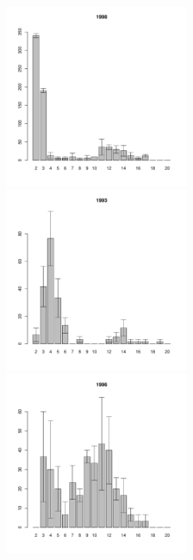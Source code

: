 \begin{figure}[hp]
\begin{minipage}[b]{.3\linewidth}
	\begin{center}
\includegraphics[width=60mm]{../White_Sea/Estuatiy_Luvenga/sizestr2_1998_.pdf}
	\end{center}
	\end{minipage}
	\begin{minipage}[b]{.3\linewidth}
	\begin{center}
	\includegraphics[width=60mm]{../White_Sea/Estuatiy_Luvenga/sizestr2_1993_.pdf}
	\end{center}
	\end{minipage}
	\hfil %
	\begin{minipage}[b]{.3\linewidth}
	\begin{center}
	\includegraphics[width=60mm]{../White_Sea/Estuatiy_Luvenga/sizestr2_1996_.pdf}

\end{center}
\end{minipage}
\end{figure}
